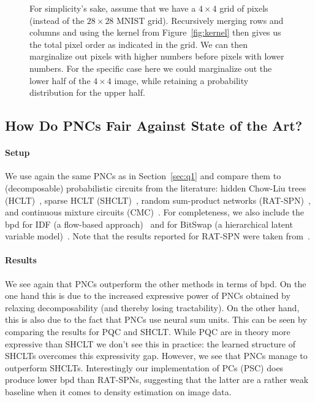 \documentclass[letterpaper]{article} %
\begin{document}
\begin{figure}[t]



    \caption{For simplicity's sake, assume that we have a $4\times4$ grid of pixels (instead of the $28\times 28$ MNIST grid). Recursively merging rows and columns and using the kernel from Figure~\ref{fig:kernel} then gives us the  total pixel order as indicated in the grid. We can then marginalize out pixels with higher numbers before pixels with lower numbers.
        For the specific case here we could marginalize out the lower half of the $4\times 4$ image, while retaining a probability distribution for the upper half.
    }
    \label{fig:2dorder}

\end{figure}

\subsection{How Do PNCs Fair Against State of the Art?}

\paragraph*{Setup} We use again the same PNCs as in Section~\ref{sec:q1} and compare them to (decomposable) probabilistic circuits from the literature: hidden Chow-Liu trees (HCLT)~\citep{liu2021tractable}, sparse HCLT (SHCLT)~\citep{dang2022sparse}, random sum-product networks (RAT-SPN)~\citep{peharz2019random}, and continuous mixture circuits (CMC)~\citep{correia2023continuous}. For completeness, we also include the bpd for IDF (a flow-based approach)~\citep{hoogeboom2019integer} and for BitSwap (a hierarchical latent variable model)~\citep{kingma2019bit}. Note that the results reported for RAT-SPN were taken from~\citep{dang2022sparse}.

\paragraph*{Results}
We see again that PNCs outperform the other methods in terms of bpd. On the one hand this is due to the increased expressive power of PNCs obtained by relaxing decomposability (and thereby losing tractability). On the other hand, this is also due to the fact that PNCs use neural sum units. This can be seen by comparing the results for PQC and SHCLT. While PQC are in theory more expressive than SHCLT we don't see this in practice: the learned structure of SHCLTs overcomes this expressivity gap. However, we see that PNCs manage to outperform SHCLTs.
Interestingly our implementation of PCs (PSC) does produce lower bpd than RAT-SPNs, suggesting that the latter are a rather weak baseline when it comes to density estimation on image data.
\end{document}
